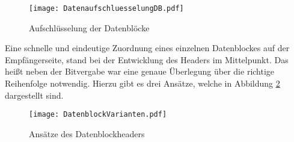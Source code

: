 \begin{figure}[H]
	\centering
	\texttt{[image: DatenaufschluesselungDB.pdf]}
	\caption{Aufschlüsselung der Datenblöcke}
  \label{fig:DatenaufschluesselungDB}
\end{figure}

Eine schnelle und eindeutige Zuordnung eines einzelnen Datenblockes auf der
Empfängerseite,  stand bei der Entwicklung des Headers im
Mittelpunkt.
Das heißt neben der Bitvergabe war eine genaue Überlegung über die richtige Reihenfolge
notwendig. Hierzu gibt es drei Ansätze, welche in Abbildung
\ref{fig:DatenblockVarianten} dargestellt sind.

\begin{figure}[H]
	\centering
	\texttt{[image: DatenblockVarianten.pdf]}
	\caption{Ansätze des Datenblockheaders}
  \label{fig:DatenblockVarianten}
\end{figure}

